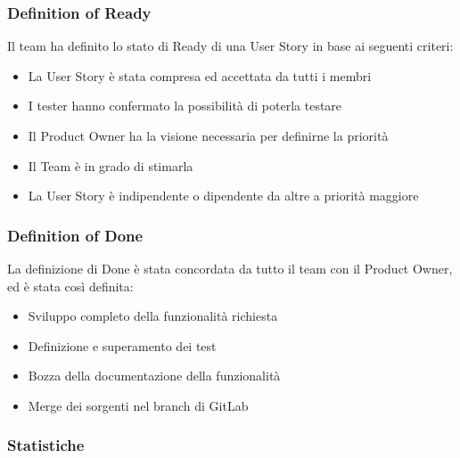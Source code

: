 \documentclass[letterpaper,10pt,italian]{sphinxmanual}
\begin{document}
\subsubsection{Definition of Ready}
\label{\detokenize{development/sprint2/index:definition-of-ready}}
\sphinxAtStartPar
Il team ha definito lo stato di Ready di una User Story in base ai seguenti criteri:
\begin{itemize}
\item {} 
\sphinxAtStartPar
La User Story è stata compresa ed accettata da tutti i membri

\item {} 
\sphinxAtStartPar
I tester hanno confermato la possibilità di poterla testare

\item {} 
\sphinxAtStartPar
Il Product Owner ha la visione necessaria per definirne la priorità

\item {} 
\sphinxAtStartPar
Il Team è in grado di stimarla

\item {} 
\sphinxAtStartPar
La User Story è indipendente o dipendente da altre a priorità maggiore

\end{itemize}


\subsubsection{Definition of Done}
\label{\detokenize{development/sprint2/index:definition-of-done}}
\sphinxAtStartPar
La definizione di Done è stata concordata da tutto il team con il Product Owner, ed è stata così definita:
\begin{itemize}
\item {} 
\sphinxAtStartPar
Sviluppo completo della funzionalità richiesta

\item {} 
\sphinxAtStartPar
Definizione e superamento dei test

\item {} 
\sphinxAtStartPar
Bozza della documentazione della funzionalità

\item {} 
\sphinxAtStartPar
Merge dei sorgenti nel branch  di GitLab

\end{itemize}


\subsubsection{Statistiche}
\label{\detokenize{development/sprint2/index:statistiche}}
\end{document}
